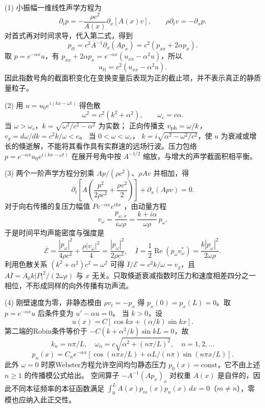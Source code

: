 (1) 小振幅一维线性声学方程为
\[
\partial_t p=-\frac{\rho c^2}{A(x)}\partial_x[A(x)v],
\qquad
\rho\partial_t v=-\partial_xp.
\]
对首式再对时间求导，代入第二式，得到
\[
\boxed{p_{tt}=c^2 A^{-1}\partial_x(Ap_x)
=c^2(p_{xx}+2\alpha p_x)}.
\]
取 \(p=e^{-\alpha x}u\)，有
\(p_{xx}+2\alpha p_x=e^{-\alpha x}(u_{xx}-\alpha^2u)\)，所以
\[
u_{tt}=c^2(u_{xx}-\alpha^2u).
\]
因此指数号角的截面积变化在变换变量后表现为正的截止项，并不表示真正的静质量粒子。

(2) 用 \(u=u_0e^{i(kx-\omega t)}\) 得色散
\[
\boxed{\omega^2=c^2(k^2+\alpha^2)},\qquad\omega_c=c\alpha.
\]
当 \(\omega>\omega_c\)，\(k=\sqrt{\omega^2/c^2-\alpha^2}\) 为实数；
正向传播支 \(v_{\rm ph}=\omega/k\)，
\(v_g=d\omega/dk=c^2k/\omega<c\)。
当 \(0<\omega<\omega_c\)，
\(k=i\sqrt{\alpha^2-\omega^2/c^2}\)，使 \(u\) 为衰减或增长的倏逝解，不能将其看作具有实群速的远场行波。压力包络 \(p=e^{-\alpha x}u_0e^{i(kx-\omega t)}\) 在展开号角中按 \(A^{-1/2}\) 缩放，与增大的声学截面积相平衡。

(3) 两个一阶声学方程分别乘 \(Ap/(\rho c^2)\)、\(\rho Av\) 并相加，得
\[
\partial_t\left[A\left(\frac{p^2}{2\rho c^2}
+\frac{\rho v^2}{2}\right)\right]+\partial_x(Apv)=0.
\]
对于向右传播的复压力幅值 \(P e^{-\alpha x}e^{ikx}\) ，由动量方程
\[
v_\omega=\frac{p_{\omega,x}}{i\omega\rho}
=\frac{k+i\alpha}{\omega\rho}\,p_\omega .
\]
于是时间平均声能密度与强度是
\[
\overline{\mathcal E}
=\frac{|p_\omega|^2}{4\rho c^2}
+\frac{\rho|v_\omega|^2}{4}
=\frac{|p_\omega|^2}{2\rho c^2},
\quad
\overline{I}=\frac12\operatorname{Re}(p_\omega v_\omega^*)
=\frac{k|p_\omega|^2}{2\omega\rho}.
\]
利用色散关系 \((k^2+\alpha^2)c^2=\omega^2\) 可得
\(\overline I/\overline{\mathcal E}=c^2k/\omega=v_g\)，且
\(A\overline I=A_0 k|P|^2/(2\omega\rho)\) 与 \(x\) 无关。只取倏逝衰减指数时压力和速度相差四分之一相位，不形成同样的向外传播有功声流。

(4) 刚壁速度为零，非静态模由 \(\rho v_t=-p_x\) 得 \(p_x(0)=p_x(L)=0\)。取
\(p=e^{-\alpha x}u\) 后条件变为 \(u'-\alpha u=0\)。
当 \(k>0\)，设
\[
u(x)=C[\cos kx+(\alpha/k)\sin kx].
\]
第二端的Robin条件等价于
\(-C(k+\alpha^2/k)\sin kL=0\)，故
\[
\boxed{k_n=n\pi/L,\quad
\omega_n=c\sqrt{\alpha^2+(n\pi/L)^2},\quad n=1,2,\dots}
\]
\[
p_n(x)=C_ne^{-\alpha x}
[\cos(n\pi x/L)+\alpha L/(n\pi)\sin(n\pi x/L)].
\]
此外 \(\omega=0\) 时原Webster方程允许空间均匀静态压力 \(p_0(x)=\mathrm{const}\)，它不由上述 \(n\ge1\) 的传播模公式给出。
空间算子 \(-A^{-1}(Ap_x)_x\) 对权重 \(A(x)\) 是自伴的，因此不同本征频率的本征函数满足
\(\int_0^L A(x)p_m(x)p_n(x)\,dx=0\)（\(m\ne n\)），零模也应纳入此正交性。
